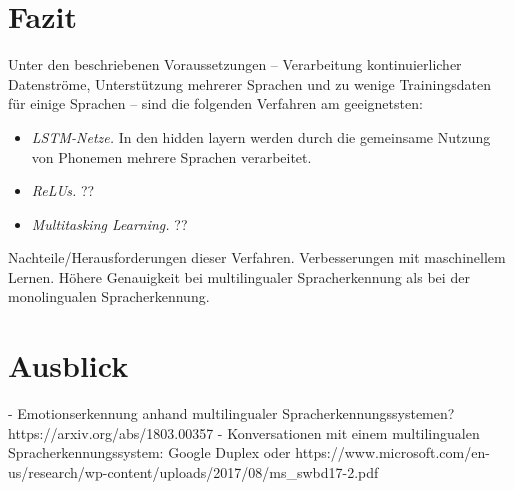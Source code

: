 \section{Fazit}
Unter den beschriebenen Voraussetzungen – Verarbeitung kontinuierlicher Datenströme, Unterstützung mehrerer Sprachen und
zu wenige Trainingsdaten für einige Sprachen – sind die folgenden Verfahren am geeignetsten:

\begin{itemize}
  \item \textit{LSTM-Netze.} In den hidden layern werden durch die gemeinsame Nutzung von Phonemen mehrere Sprachen verarbeitet.
  \item \textit{ReLUs.} ??
  \item \textit{Multitasking Learning.} ??
\end{itemize}

Nachteile/Herausforderungen dieser Verfahren.
Verbesserungen mit maschinellem Lernen.
Höhere Genauigkeit bei multilingualer Spracherkennung als bei der monolingualen Spracherkennung.

\section{Ausblick}
- Emotionserkennung anhand multilingualer Spracherkennungssystemen? https://arxiv.org/abs/1803.00357
- Konversationen mit einem multilingualen Spracherkennungssystem: Google Duplex oder https://www.microsoft.com/en-us/research/wp-content/uploads/2017/08/ms\_swbd17-2.pdf

\ifCLASSOPTIONcaptionsoff
  \newpage
\fi